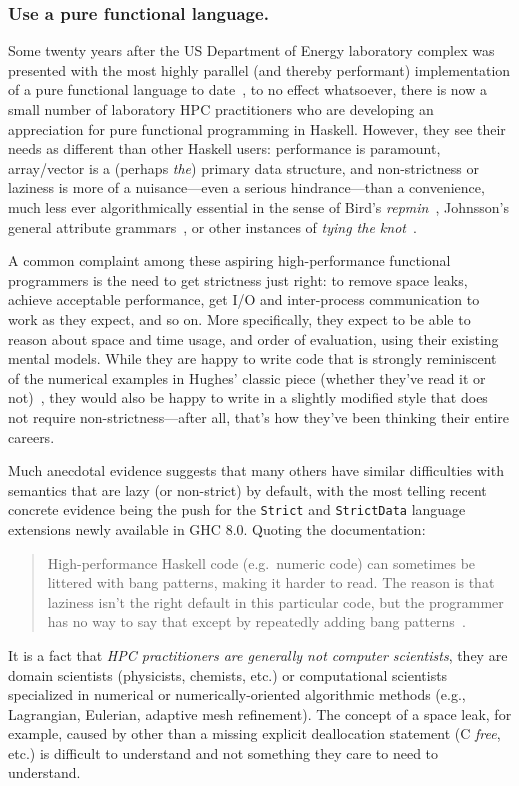 \documentclass{llncs}
\begin{document}
\subsubsection{Use a pure functional language.}
Some twenty years after the US Department of Energy laboratory complex was
presented with the most highly parallel (and thereby performant)
implementation of a pure functional language to date~\cite{Davis96}, to no
effect whatsoever, there is now a small number of laboratory HPC practitioners
who are developing an appreciation for pure functional programming in Haskell.
However, they see their needs as different than other Haskell users: performance
is paramount, array/vector
is a (perhaps \emph{the}) primary data
structure, and non-strictness or laziness is more of a nuisance---even a
serious hindrance---than a convenience, much less ever algorithmically
essential in the sense of Bird's \emph{repmin}~\cite{Bird84},
Johnsson's general attribute grammars~\cite{Johnsson87}, 
or other instances of \emph{tying the knot}~\cite{tying-the-knot}.

A common complaint among these aspiring high-performance functional
programmers is the need to get strictness just right: to remove space leaks,
achieve acceptable performance, get I/O and inter-process communication to work
as they expect, and so on.  More specifically, they expect to be able to
reason about space and time usage, and order of evaluation, using their
existing mental models. While they are happy to write code that is strongly
reminiscent of the numerical examples in Hughes' classic piece (whether
they've read it or not)~\cite{Hughes89}, they would also be happy to write in
a slightly modified style that does not require non-strictness---after all,
that's how they've been thinking their entire careers.

Much anecdotal evidence suggests that many others have similar difficulties
with semantics that are lazy (or non-strict) by default, with the most telling
recent concrete evidence being the push for the \texttt{Strict} and
\texttt{StrictData} language extensions newly available in GHC 8.0.  Quoting
the documentation:
\begin{quote}
  High-performance Haskell code (e.g.\ numeric code) can sometimes be littered
  with bang patterns, making it harder to read. The reason is that laziness
  isn't the right default in this particular code, but the programmer has no
  way to say that except by repeatedly adding bang
  patterns~\cite{strict-strictdata}.
\end{quote}
It is a fact that \emph{HPC practitioners are generally not computer
  scientists}, they are domain scientists (physicists, chemists, etc.) or
computational scientists specialized in numerical or numerically-oriented
algorithmic methods (e.g., Lagrangian, Eulerian, adaptive mesh refinement).
The concept of a space leak, for example, caused by other than a missing
explicit deallocation statement (C \emph{free}, etc.) is difficult to
understand and not something they care to need to understand.
\end{document}
